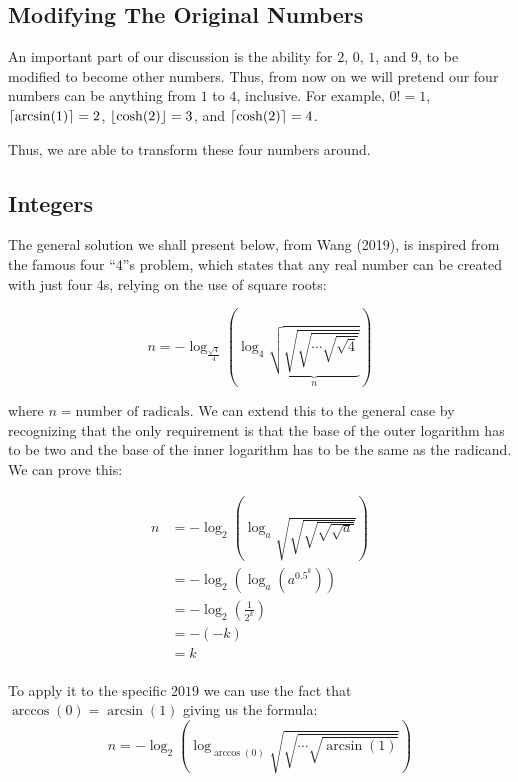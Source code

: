 \documentclass{article}
\DeclarePairedDelimiter\ceil{\lceil}{\rceil}
\DeclarePairedDelimiter\floor{\lfloor}{\rfloor}
\begin{document}
\subsection{Modifying The Original Numbers}

An important part of our discussion is the ability for $2$, $0$, $1$, and $9$, to be modified to become other numbers. Thus, from now on we will pretend our four numbers can be anything from $1$ to $4$, inclusive. For example, $0! = 1$, $\ceil{\arcsin(1)}=2$, $\floor{\cosh(2)}=3$, and $\ceil{\cosh(2)}=4$.

Thus, we are able to transform these four numbers around.

\subsection{Integers}

The general solution we shall present below, from Wang (2019), is inspired from the famous four ``4''s  problem, which states that any real number can be created with just four 4s, relying on the use of square roots:

\begin{equation}
    n = -\log_\frac{\sqrt{4}}{4}\left( \log_4 \underbrace{\sqrt{\sqrt{\sqrt{\cdots\sqrt{\sqrt{4}}}}}}_{n} \right)
\end{equation}

where $n=\textrm{number of radicals}$. We can extend this to the general case by recognizing that the only requirement is that the base of the outer logarithm has to be two and the base of the inner logarithm has to be the same as the radicand. We can prove this:

\begin{align*}
    n &= -\log_2\left(\log_a \sqrt{\sqrt{\sqrt{\sqrt{\sqrt{a}}}}}\right) \\
    &= -\log_2\left(\log_a \left(a^{0.5^k}\right)\right) \\
    &= -\log_2\left(\frac{1}{2^k}\right) \\
    &= -(-k) \\
    &= k \\
\end{align*}

To apply it to the specific $2019$ we can use the fact that $\arccos(0) = \arcsin(1)$ giving us the formula:
\begin{equation}
    n = -\log_2\left( \log_{\arccos(0)} \sqrt{\sqrt{\cdots\sqrt{\arcsin(1)}}}\right)
\end{equation}
\end{document}

